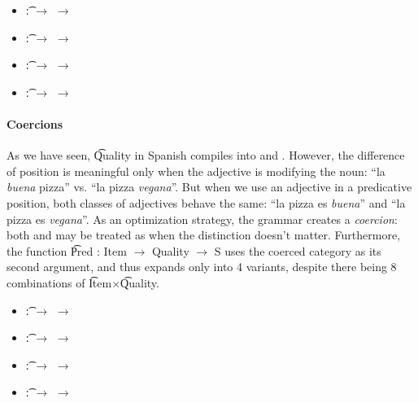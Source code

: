 \begin{itemize}
\setlength\itemsep{0em}
\item {} \t{:}  $\rightarrow$  $\rightarrow$ 
\item  {} \t{:}  $\rightarrow$  $\rightarrow$ 
\item  {}\t{:}  $\rightarrow$  $\rightarrow$ 
\item {} \t{:}  $\rightarrow$  $\rightarrow$ 
\end{itemize}


\paragraph{Coercions}
\label{sec:Coercions}
As we have seen, \t{Quality} in Spanish compiles into  and
. However, the difference of position is meaningful only when the
adjective is modifying the noun: ``la \emph{buena} pizza'' vs. ``la pizza
\emph{vegana}''. But when we use an adjective in a predicative position, both
classes of adjectives behave the same: ``la pizza es \emph{buena}''
and ``la pizza es \emph{vegana}''. As an optimization strategy, the
grammar creates a {\it coercion}: both  and 
may be treated as \quality{*} when the distinction doesn't matter. 
Furthermore, the function \t{Pred : Item $\rightarrow$ Quality $\rightarrow$ S} uses
the coerced category \quality{*} as its second argument, and thus
expands only into 4 variants, despite there being 8 combinations of
\t{Item}$\times$\t{Quality}.

\begin{itemize}
\setlength\itemsep{0em}
\item {} \t{:}  $\rightarrow$ \quality{*} $\rightarrow$ \comment
\item  {} \t{:}  $\rightarrow$ \quality{*} $\rightarrow$ \comment
\item  {} \t{:}  $\rightarrow$ \quality{*} $\rightarrow$ \comment
\item {} \t{:}  $\rightarrow$ \quality{*} $\rightarrow$ \comment
\end{itemize}